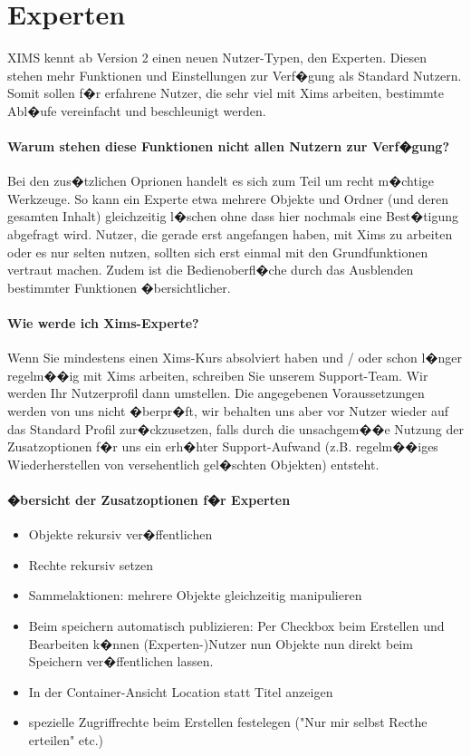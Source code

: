 \section{Experten}
\label{experten}

XIMS kennt ab Version 2 einen neuen Nutzer-Typen, den Experten. Diesen stehen mehr Funktionen und Einstellungen zur Verf�gung als Standard Nutzern. Somit sollen f�r erfahrene Nutzer, die sehr viel mit Xims arbeiten, bestimmte Abl�ufe vereinfacht und beschleunigt werden.

\paragraph{Warum stehen diese Funktionen nicht allen Nutzern zur Verf�gung?}
Bei den zus�tzlichen Oprionen handelt es sich zum Teil um recht m�chtige Werkzeuge. So kann ein Experte etwa mehrere Objekte und Ordner (und deren gesamten Inhalt) gleichzeitig l�schen ohne dass hier nochmals eine Best�tigung abgefragt wird. Nutzer, die gerade erst angefangen haben, mit Xims zu arbeiten oder es nur selten nutzen, sollten sich erst einmal mit den Grundfunktionen vertraut machen. Zudem ist die Bedienoberfl�che durch das Ausblenden bestimmter Funktionen �bersichtlicher.

\paragraph{Wie werde ich Xims-Experte?}
Wenn Sie mindestens einen Xims-Kurs absolviert haben und / oder schon l�nger regelm��ig mit Xims arbeiten, schreiben Sie unserem Support-Team. Wir werden Ihr Nutzerprofil dann umstellen. Die angegebenen Voraussetzungen werden von uns nicht �berpr�ft, wir behalten uns aber vor Nutzer wieder auf das Standard Profil zur�ckzusetzen, falls durch die unsachgem��e Nutzung der Zusatzoptionen f�r uns ein erh�hter Support-Aufwand (z.B. regelm��iges Wiederherstellen von versehentlich gel�schten Objekten) entsteht.

\paragraph{�bersicht der Zusatzoptionen f�r Experten}
\begin{itemize}
	\item Objekte rekursiv ver�ffentlichen
  \item Rechte rekursiv setzen
	\item{Sammelaktionen: mehrere Objekte gleichzeitig manipulieren		}
	\item Beim speichern automatisch publizieren: Per Checkbox beim Erstellen und Bearbeiten k�nnen (Experten-)Nutzer nun Objekte nun direkt beim Speichern ver�ffentlichen lassen.
  \item In der Container-Ansicht Location statt Titel anzeigen
  \item spezielle Zugriffrechte beim Erstellen festelegen ("Nur mir selbst Recthe erteilen" etc.)
\end{itemize}    



